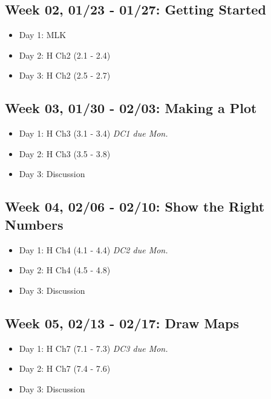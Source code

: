 \documentclass[11pt,]{article}
\begin{document}
\hypertarget{week-02-0123---0127-getting-started}{%
\subsection{Week 02, 01/23 - 01/27: Getting
Started}\label{week-02-0123---0127-getting-started}}

\begin{itemize}
\item
  Day 1: MLK
\item
  Day 2: H Ch2 (2.1 - 2.4)
\item
  Day 3: H Ch2 (2.5 - 2.7)
\end{itemize}

\hypertarget{week-03-0130---0203-making-a-plot}{%
\subsection{Week 03, 01/30 - 02/03: Making a
Plot}\label{week-03-0130---0203-making-a-plot}}

\begin{itemize}
\item
  Day 1: H Ch3 (3.1 - 3.4) \hfill \textit{DC1 due Mon.}
\item
  Day 2: H Ch3 (3.5 - 3.8)
\item
  Day 3: Discussion
\end{itemize}

\hypertarget{week-04-0206---0210-show-the-right-numbers}{%
\subsection{Week 04, 02/06 - 02/10: Show the Right
Numbers}\label{week-04-0206---0210-show-the-right-numbers}}

\begin{itemize}
\item
  Day 1: H Ch4 (4.1 - 4.4) \hfill \textit{DC2 due Mon.}
\item
  Day 2: H Ch4 (4.5 - 4.8)
\item
  Day 3: Discussion
\end{itemize}

\hypertarget{week-05-0213---0217-draw-maps}{%
\subsection{Week 05, 02/13 - 02/17: Draw
Maps}\label{week-05-0213---0217-draw-maps}}

\begin{itemize}
\item
  Day 1: H Ch7 (7.1 - 7.3) \hfill \textit{DC3 due Mon.}
\item
  Day 2: H Ch7 (7.4 - 7.6)
\item
  Day 3: Discussion
\end{itemize}
\end{document}
